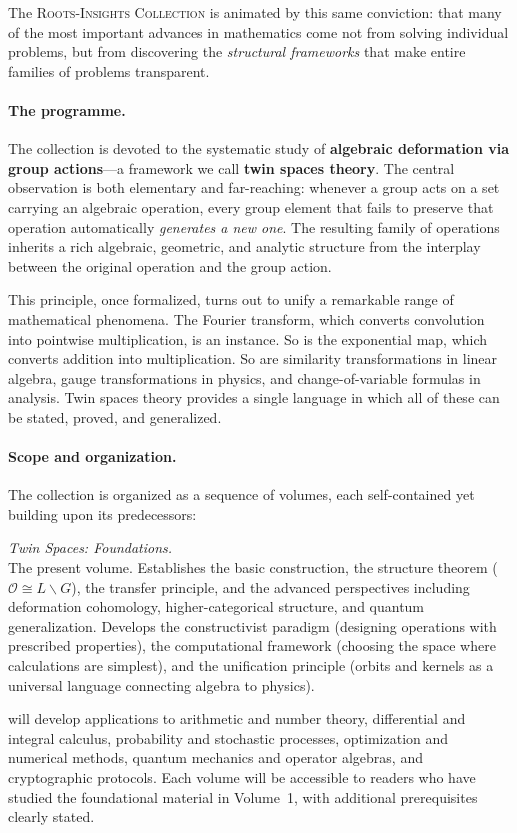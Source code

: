 \documentclass[11pt,a4paper,openany]{book}
\theoremstyle{plain}
\theoremstyle{definition}
\newcommand{\opspace}{\mathcal{O}}
\newcommand{\lingroup}{L}
\newcommand{\groupG}{G}
\begin{document}
The \textsc{Roots-Insights Collection} is animated by this same conviction: that many of the most important advances in mathematics come not from solving individual problems, but from discovering the \emph{structural frameworks} that make entire families of problems transparent.

\paragraph{The programme.}
The collection is devoted to the systematic study of \textbf{algebraic deformation via group actions}---a framework we call \textbf{twin spaces theory}. The central observation is both elementary and far-reaching: whenever a group acts on a set carrying an algebraic operation, every group element that fails to preserve that operation automatically \emph{generates a new one}. The resulting family of operations inherits a rich algebraic, geometric, and analytic structure from the interplay between the original operation and the group action.

This principle, once formalized, turns out to unify a remarkable range of mathematical phenomena. The Fourier transform, which converts convolution into pointwise multiplication, is an instance. So is the exponential map, which converts addition into multiplication. So are similarity transformations in linear algebra, gauge transformations in physics, and change-of-variable formulas in analysis. Twin spaces theory provides a single language in which all of these can be stated, proved, and generalized.

\paragraph{Scope and organization.}
The collection is organized as a sequence of volumes, each self-contained yet building upon its predecessors:

\begin{description}[leftmargin=1.5cm,style=nextline]
\item[Volume~1.] \textit{Twin Spaces: Foundations.}\\
The present volume. Establishes the basic construction, the structure theorem ($\opspace \cong \lingroup\backslash\groupG$), the transfer principle, and the advanced perspectives including deformation cohomology, higher-categorical structure, and quantum generalization. Develops the constructivist paradigm (designing operations with prescribed properties), the computational framework (choosing the space where calculations are simplest), and the unification principle (orbits and kernels as a universal language connecting algebra to physics).

\item[Future volumes] will develop applications to arithmetic and number theory, differential and integral calculus, probability and stochastic processes, optimization and numerical methods, quantum mechanics and operator algebras, and cryptographic protocols. Each volume will be accessible to readers who have studied the foundational material in Volume~1, with additional prerequisites clearly stated.
\end{description}
\end{document}
